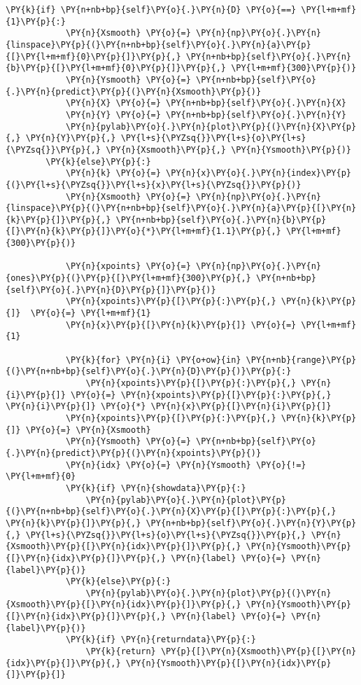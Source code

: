 \begin{Verbatim}[commandchars=\\\{\}]
        \PY{k}{if} \PY{n+nb+bp}{self}\PY{o}{.}\PY{n}{D} \PY{o}{==} \PY{l+m+mf}{1}\PY{p}{:}
            \PY{n}{Xsmooth} \PY{o}{=} \PY{n}{np}\PY{o}{.}\PY{n}{linspace}\PY{p}{(}\PY{n+nb+bp}{self}\PY{o}{.}\PY{n}{a}\PY{p}{[}\PY{l+m+mf}{0}\PY{p}{]}\PY{p}{,} \PY{n+nb+bp}{self}\PY{o}{.}\PY{n}{b}\PY{p}{[}\PY{l+m+mf}{0}\PY{p}{]}\PY{p}{,} \PY{l+m+mf}{300}\PY{p}{)}
            \PY{n}{Ysmooth} \PY{o}{=} \PY{n+nb+bp}{self}\PY{o}{.}\PY{n}{predict}\PY{p}{(}\PY{n}{Xsmooth}\PY{p}{)}
            \PY{n}{X} \PY{o}{=} \PY{n+nb+bp}{self}\PY{o}{.}\PY{n}{X}
            \PY{n}{Y} \PY{o}{=} \PY{n+nb+bp}{self}\PY{o}{.}\PY{n}{Y}
            \PY{n}{pylab}\PY{o}{.}\PY{n}{plot}\PY{p}{(}\PY{n}{X}\PY{p}{,} \PY{n}{Y}\PY{p}{,} \PY{l+s}{\PYZsq{}}\PY{l+s}{o}\PY{l+s}{\PYZsq{}}\PY{p}{,} \PY{n}{Xsmooth}\PY{p}{,} \PY{n}{Ysmooth}\PY{p}{)}
        \PY{k}{else}\PY{p}{:}
            \PY{n}{k} \PY{o}{=} \PY{n}{x}\PY{o}{.}\PY{n}{index}\PY{p}{(}\PY{l+s}{\PYZsq{}}\PY{l+s}{x}\PY{l+s}{\PYZsq{}}\PY{p}{)}
            \PY{n}{Xsmooth} \PY{o}{=} \PY{n}{np}\PY{o}{.}\PY{n}{linspace}\PY{p}{(}\PY{n+nb+bp}{self}\PY{o}{.}\PY{n}{a}\PY{p}{[}\PY{n}{k}\PY{p}{]}\PY{p}{,} \PY{n+nb+bp}{self}\PY{o}{.}\PY{n}{b}\PY{p}{[}\PY{n}{k}\PY{p}{]}\PY{o}{*}\PY{l+m+mf}{1.1}\PY{p}{,} \PY{l+m+mf}{300}\PY{p}{)}

            \PY{n}{xpoints} \PY{o}{=} \PY{n}{np}\PY{o}{.}\PY{n}{ones}\PY{p}{(}\PY{p}{[}\PY{l+m+mf}{300}\PY{p}{,} \PY{n+nb+bp}{self}\PY{o}{.}\PY{n}{D}\PY{p}{]}\PY{p}{)}
            \PY{n}{xpoints}\PY{p}{[}\PY{p}{:}\PY{p}{,} \PY{n}{k}\PY{p}{]}  \PY{o}{=} \PY{l+m+mf}{1}
            \PY{n}{x}\PY{p}{[}\PY{n}{k}\PY{p}{]} \PY{o}{=} \PY{l+m+mf}{1}

            \PY{k}{for} \PY{n}{i} \PY{o+ow}{in} \PY{n+nb}{range}\PY{p}{(}\PY{n+nb+bp}{self}\PY{o}{.}\PY{n}{D}\PY{p}{)}\PY{p}{:}
                \PY{n}{xpoints}\PY{p}{[}\PY{p}{:}\PY{p}{,} \PY{n}{i}\PY{p}{]} \PY{o}{=} \PY{n}{xpoints}\PY{p}{[}\PY{p}{:}\PY{p}{,} \PY{n}{i}\PY{p}{]} \PY{o}{*} \PY{n}{x}\PY{p}{[}\PY{n}{i}\PY{p}{]}
            \PY{n}{xpoints}\PY{p}{[}\PY{p}{:}\PY{p}{,} \PY{n}{k}\PY{p}{]} \PY{o}{=} \PY{n}{Xsmooth}
            \PY{n}{Ysmooth} \PY{o}{=} \PY{n+nb+bp}{self}\PY{o}{.}\PY{n}{predict}\PY{p}{(}\PY{n}{xpoints}\PY{p}{)}
            \PY{n}{idx} \PY{o}{=} \PY{n}{Ysmooth} \PY{o}{!=} \PY{l+m+mf}{0}
            \PY{k}{if} \PY{n}{showdata}\PY{p}{:}
                \PY{n}{pylab}\PY{o}{.}\PY{n}{plot}\PY{p}{(}\PY{n+nb+bp}{self}\PY{o}{.}\PY{n}{X}\PY{p}{[}\PY{p}{:}\PY{p}{,} \PY{n}{k}\PY{p}{]}\PY{p}{,} \PY{n+nb+bp}{self}\PY{o}{.}\PY{n}{Y}\PY{p}{,} \PY{l+s}{\PYZsq{}}\PY{l+s}{o}\PY{l+s}{\PYZsq{}}\PY{p}{,} \PY{n}{Xsmooth}\PY{p}{[}\PY{n}{idx}\PY{p}{]}\PY{p}{,} \PY{n}{Ysmooth}\PY{p}{[}\PY{n}{idx}\PY{p}{]}\PY{p}{,} \PY{n}{label} \PY{o}{=} \PY{n}{label}\PY{p}{)}
            \PY{k}{else}\PY{p}{:}
                \PY{n}{pylab}\PY{o}{.}\PY{n}{plot}\PY{p}{(}\PY{n}{Xsmooth}\PY{p}{[}\PY{n}{idx}\PY{p}{]}\PY{p}{,} \PY{n}{Ysmooth}\PY{p}{[}\PY{n}{idx}\PY{p}{]}\PY{p}{,} \PY{n}{label} \PY{o}{=} \PY{n}{label}\PY{p}{)}
            \PY{k}{if} \PY{n}{returndata}\PY{p}{:}
                \PY{k}{return} \PY{p}{[}\PY{n}{Xsmooth}\PY{p}{[}\PY{n}{idx}\PY{p}{]}\PY{p}{,} \PY{n}{Ysmooth}\PY{p}{[}\PY{n}{idx}\PY{p}{]}\PY{p}{]}


\end{Verbatim}
